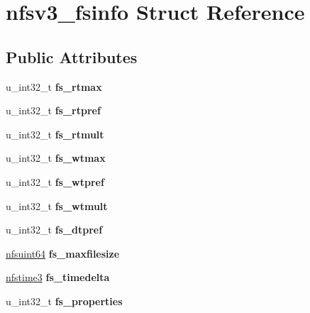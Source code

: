 \hypertarget{structnfsv3__fsinfo}{
\section{nfsv3\_\-fsinfo Struct Reference}
\label{structnfsv3__fsinfo}
}
\subsection*{Public Attributes}
\begin{DoxyCompactItemize}
\item 
\hypertarget{structnfsv3__fsinfo_af828d48c395cb2d187144dc2768a571e}{
u\_\-int32\_\-t {\bfseries fs\_\-rtmax}}
\label{structnfsv3__fsinfo_af828d48c395cb2d187144dc2768a571e}

\item 
\hypertarget{structnfsv3__fsinfo_af2201b26e149862252ae4de051c967f7}{
u\_\-int32\_\-t {\bfseries fs\_\-rtpref}}
\label{structnfsv3__fsinfo_af2201b26e149862252ae4de051c967f7}

\item 
\hypertarget{structnfsv3__fsinfo_ade4de7f1295b323b9853d4802d6329d4}{
u\_\-int32\_\-t {\bfseries fs\_\-rtmult}}
\label{structnfsv3__fsinfo_ade4de7f1295b323b9853d4802d6329d4}

\item 
\hypertarget{structnfsv3__fsinfo_a38b4fa4795bb7389b19b9a0bbb7dae70}{
u\_\-int32\_\-t {\bfseries fs\_\-wtmax}}
\label{structnfsv3__fsinfo_a38b4fa4795bb7389b19b9a0bbb7dae70}

\item 
\hypertarget{structnfsv3__fsinfo_a9719d5504345e534275ddc607f2e174a}{
u\_\-int32\_\-t {\bfseries fs\_\-wtpref}}
\label{structnfsv3__fsinfo_a9719d5504345e534275ddc607f2e174a}

\item 
\hypertarget{structnfsv3__fsinfo_a06cd13e75e42946c691c6de936f69629}{
u\_\-int32\_\-t {\bfseries fs\_\-wtmult}}
\label{structnfsv3__fsinfo_a06cd13e75e42946c691c6de936f69629}

\item 
\hypertarget{structnfsv3__fsinfo_a071beac047202407e2c76d265bea8967}{
u\_\-int32\_\-t {\bfseries fs\_\-dtpref}}
\label{structnfsv3__fsinfo_a071beac047202407e2c76d265bea8967}

\item 
\hypertarget{structnfsv3__fsinfo_aa307e1d614f61c03c878e5740ba3f905}{
\hyperlink{structnfs__uquad}{nfsuint64} {\bfseries fs\_\-maxfilesize}}
\label{structnfsv3__fsinfo_aa307e1d614f61c03c878e5740ba3f905}

\item 
\hypertarget{structnfsv3__fsinfo_a13a51eb9b45414eb2b909c05f323ea14}{
\hyperlink{structnfsv3__time}{nfstime3} {\bfseries fs\_\-timedelta}}
\label{structnfsv3__fsinfo_a13a51eb9b45414eb2b909c05f323ea14}

\item 
\hypertarget{structnfsv3__fsinfo_a264d3e70c425effda09f7db92146dd24}{
u\_\-int32\_\-t {\bfseries fs\_\-properties}}
\label{structnfsv3__fsinfo_a264d3e70c425effda09f7db92146dd24}

\end{DoxyCompactItemize}


